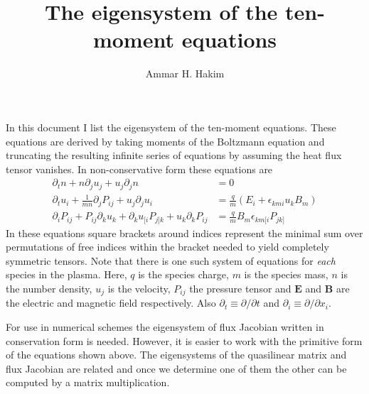 \documentclass[11pt, reqno]{amsart}
\title[Tenmoment Eigensystem]{The eigensystem of the ten-moment
  equations}%
\author{Ammar H. Hakim}%
\date{}
\theoremstyle{definition}
\begin{document}
\maketitle

In this document I list the eigensystem of the ten-moment
equations. These equations are derived by taking moments of the
Boltzmann equation and truncating the resulting infinite series of
equations by assuming the heat flux tensor vanishes. In
non-conservative form these equations are
\begin{align}
  \partial_t{n} + n \partial_j{u_j} + u_j \partial_j{n} &= 0\\
  \partial_t{u_i}
  + \frac{1}{mn}\partial_j{P_{ij}}
  + u_j \partial_j{u_i} &=
  \frac{q}{m}\left(E_i + \epsilon_{kmi}u_kB_m\right) \\
  \partial_i{P_{ij}} + P_{ij}\partial_k{u_k}
  + \partial_k{u_{[i}}P_{j]k}
  + u_k\partial_k{P_{ij}}
  &= \frac{q}{m}B_m \epsilon_{km[i}P_{jk]}
\end{align}
In these equations square brackets around indices represent the
minimal sum over permutations of free indices within the bracket
needed to yield completely symmetric tensors. Note that there is one
such system of equations for \emph{each} species in the plasma. Here,
$q$ is the species charge, $m$ is the species mass, $n$ is the number
density, $u_j$ is the velocity, $P_{ij}$ the pressure tensor and
$\mathbf{E}$ and $\mathbf{B}$ are the electric and magnetic field
respectively. Also $\partial_t \equiv \partial /\partial t$ and
$\partial_i \equiv \partial /\partial x_i$.

For use in numerical schemes the eigensystem of flux Jacobian written
in conservation form is needed. However, it is easier to work with the
primitive form of the equations shown above. The eigensystems of the
quasilinear matrix and flux Jacobian are related and once we determine
one of them the other can be computed by a matrix multiplication.
\end{document}
